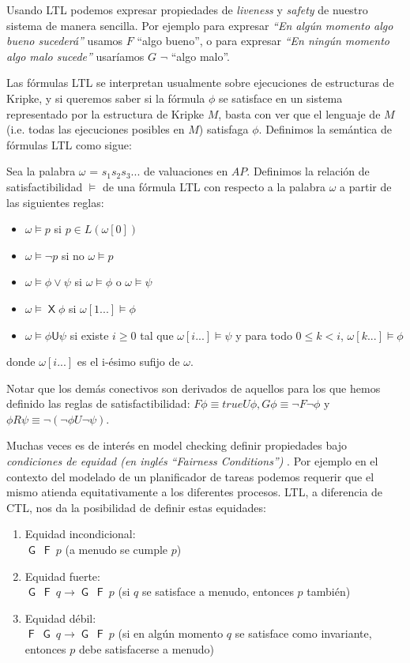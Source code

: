 \documentclass[titlepage, 12pt]{book}
\newcommand{\X}{\mathop{\mathsf{X}}}
\newcommand{\G}{\mathop{\mathsf{G}}}
\newcommand{\F}{\mathop{\mathsf{F}}}
\newcommand{\U}{\mathbin{\textsf{U}}}
\begin{document}
Usando LTL podemos expresar propiedades de \textit{liveness} y \textit{safety} de nuestro sistema de manera sencilla. Por ejemplo para expresar \textit{``En alg\'un momento algo bueno suceder\'a''} usamos  $F$ ``algo bueno'', o para expresar \textit{``En ning\'un momento algo malo sucede''} usar\'iamos $G$ $\neg$ ``algo malo''.

Las f\'ormulas LTL se interpretan usualmente sobre ejecuciones de estructuras de Kripke, y si queremos saber si la f\'ormula $\phi$ se satisface en un sistema representado por la estructura de Kripke $M$, basta con ver que el lenguaje de $M$ (i.e. todas las ejecuciones posibles en $M$) satisfaga $\phi$. Definimos la sem\'antica de f\'ormulas LTL como sigue:

Sea la palabra $\omega$ = $s_1s_2s_3...$ de valuaciones en $AP$. Definimos la relaci\'on de satisfactibilidad $\models$ de una f\'ormula LTL con respecto a la palabra $\omega$ a partir de las siguientes reglas:
\begin{itemize}
\item $\omega \models p $ si $ p \in L(\omega[0])$
\item $\omega \models \neg p $ si no $\omega \models p$
\item $\omega \models \phi \vee \psi$ si $\omega \models \phi$ o $\omega \models \psi$
\item $\omega \models \X \phi$ si $\omega[1...] \models \phi$
\item $\omega \models \phi \U \psi$ si existe $i \geq 0$ tal que  $\omega[i...] \models \psi$ y para todo $0 \leq k < i$, $\omega[k...] \models \phi$ 
\end{itemize}
donde $\omega[i...]$ es el i-\'esimo sufijo de $\omega$.

Notar que los dem\'as conectivos son derivados de aquellos para los que hemos definido las reglas de satisfactibilidad: $F \phi \equiv true U \phi, G \phi \equiv \neg F \neg \phi$ y $\phi R \psi \equiv \neg(\neg\phi U \neg\psi).$

Muchas veces es de inter\'es en model checking definir propiedades bajo \textit{condiciones de equidad (en ingl\'es ``Fairness Conditions'')} . Por ejemplo en el contexto del modelado de un planificador de tareas podemos requerir que el mismo atienda equitativamente a los diferentes procesos. LTL, a diferencia de CTL, nos da la posibilidad de definir estas equidades:

\begin{enumerate}
\item Equidad incondicional:\\[0.3cm] $\G~\F~p$ (a menudo se cumple $p$)
\item Equidad fuerte:\\[0.3cm] $\G~\F~q \rightarrow \G~\F~p$ (si $q$ se satisface a menudo, entonces $p$ tambi\'en)
\item Equidad d\'ebil:\\[0.3cm] $\F~\G~q \rightarrow \G~\F~p$ (si en alg\'un momento $q$ se satisface como invariante, entonces $p$ debe satisfacerse a menudo)
\end{enumerate}
\end{document}
